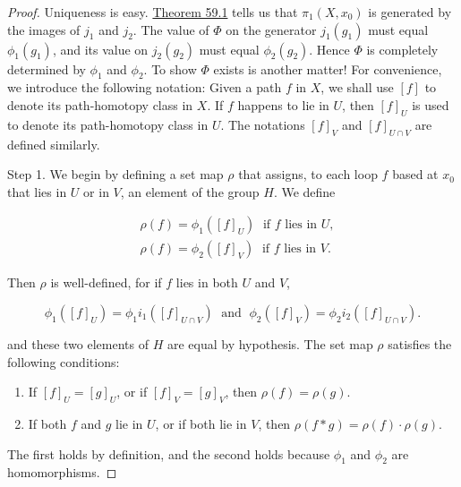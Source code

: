 \begin{proof}
Uniqueness is easy. \hyperref[thm:59.1]{Theorem 59.1} tells us that \({\pi }_{1}( {X,x_{0}})\) is generated by the images of \(j_{1}\) and \(j_{2}\). The value of \(\Phi\) on the generator \(j_{1}( g_{1})\) must equal \({\phi }_{1}( g_{1})\), and its value on \(j_{2}( g_{2})\) must equal \({\phi }_{2}( g_{2})\). Hence \(\Phi\) is completely determined by \({\phi }_{1}\) and \({\phi }_{2}\). To show \(\Phi\) exists is another matter!
For convenience, we introduce the following notation: Given a path \(f\) in \(X\), we shall use \([ f]\) to denote its path-homotopy class in \(X\). If \(f\) happens to lie in \(U\), then \({[ f] }_{U}\) is used to denote its path-homotopy class in \(U\). The notations \({[ f] }_{V}\) and \({[ f] }_{U \cap V}\) are defined similarly.

Step 1. We begin by defining a set map \(\rho\) that assigns, to each loop \(f\) based at \(x_{0}\) that lies in \(U\) or in \(V\), an element of the group \(H\). We define

\[
\begin{aligned} & \rho ( f) = {\phi }_{1}( {[ f] }_{U}) \;\text{ if }f\text{ lies in }U, \\ & \rho ( f) = {\phi }_{2}( {[ f] }_{V}) \;\text{ if }f\text{ lies in }V. \end{aligned}
\]

Then \(\rho\) is well-defined, for if \(f\) lies in both \(U\) and \(V\),

\[
{\phi }_{1}( {[ f] }_{U}) = {\phi }_{1}i_{1}( {[ f] }_{U \cap V}) \;\text{ and }\;{\phi }_{2}( {[ f] }_{V}) = {\phi }_{2}i_{2}( {[ f] }_{U \cap V}).
\]

and these two elements of \(H\) are equal by hypothesis. The set map \(\rho\) satisfies the following conditions:

\begin{enumerate}[itemsep=0.2em, parsep=0pt, topsep=0pt, partopsep=0pt, leftmargin=*, label=(\arabic*), align=left]
\item If \({[ f] }_{U} = {[ g] }_{U}\), or if \({[ f] }_{V} = {[ g] }_{V}\), then \(\rho ( f) = \rho ( g)\).
\item If both \(f\) and \(g\) lie in \(U\), or if both lie in \(V\), then \(\rho ( {f * g}) = \rho ( f) \cdot \rho ( g)\).
\end{enumerate}

The first holds by definition, and the second holds because \({\phi }_{1}\) and \({\phi }_{2}\) are homomorphisms.


\end{proof}
